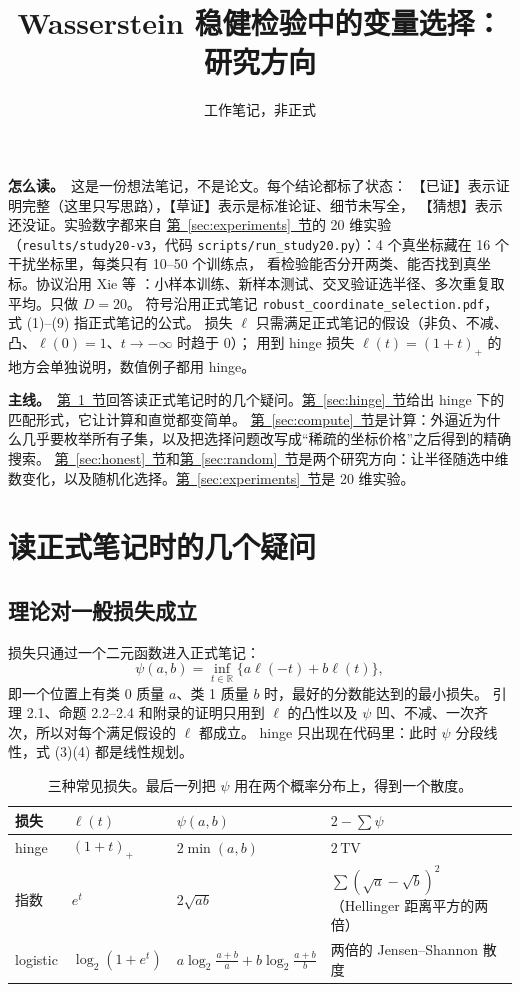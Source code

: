 \documentclass[11pt,a4paper,fontset=none]{ctexart}
\title{\bfseries Wasserstein 稳健检验中的变量选择：研究方向}
\author{}
\date{工作笔记，非正式}
\newcommand{\Secref}[1]{\hyperref[#1]{第~\ref*{#1}~节}}
\newcommand{\TV}{\mathrm{TV}}
\theoremstyle{definition}
\newcommand{\para}[1]{\par\smallskip\noindent\textbf{#1}\ }
\newcommand{\status}[1]{\textrm{【#1】}}
\begin{document}
\pagestyle{plain}
\maketitle
\vspace{-2em}

\para{怎么读。}这是一份想法笔记，不是论文。每个结论都标了状态：
\status{已证}表示证明完整（这里只写思路），\status{草证}表示是标准论证、细节未写全，
\status{猜想}表示还没证。实验数字都来自 \Secref{sec:experiments}的 20 维实验
（\texttt{results/study20-v3}，代码 \texttt{scripts/run\_study20.py}）：4 个真坐标藏在 16 个干扰坐标里，每类只有 10--50 个训练点，
看检验能否分开两类、能否找到真坐标。协议沿用 Xie 等 \cite{xie2021robust}：小样本训练、新样本测试、交叉验证选半径、多次重复取平均。只做 $D=20$。
符号沿用正式笔记 \texttt{robust\_coordinate\_selection.pdf}，式 (1)--(9) 指正式笔记的公式。
损失 $\ell$ 只需满足正式笔记的假设（非负、不减、凸、$\ell(0)=1$、$t\to-\infty$ 时趋于 0）；
用到 hinge 损失 $\ell(t)=(1+t)_+$ 的地方会单独说明，数值例子都用 hinge。

\para{主线。}\Secref{sec:faq}回答读正式笔记时的几个疑问。\Secref{sec:hinge}给出 hinge 下的匹配形式，它让计算和直觉都变简单。
\Secref{sec:compute}是计算：外逼近为什么几乎要枚举所有子集，以及把选择问题改写成“稀疏的坐标价格”之后得到的精确搜索。
\Secref{sec:honest}和\Secref{sec:random}是两个研究方向：让半径随选中维数变化，以及随机化选择。\Secref{sec:experiments}是 20 维实验。

\section{读正式笔记时的几个疑问}\label{sec:faq}

\subsection{理论对一般损失成立}
损失只通过一个二元函数进入正式笔记：
\[
\psi(a,b)=\inf_{t\in\mathbb R}\{a\ell(-t)+b\ell(t)\},
\]
即一个位置上有类 0 质量 $a$、类 1 质量 $b$ 时，最好的分数能达到的最小损失。
引理 2.1、命题 2.2--2.4 和附录的证明只用到 $\ell$ 的凸性以及 $\psi$ 凹、不减、一次齐次，所以对每个满足假设的 $\ell$ 都成立。
hinge 只出现在代码里：此时 $\psi$ 分段线性，式 (3)(4) 都是线性规划。

\begin{table}[htbp]
\centering\small
\begin{tabular}{llll}
\toprule
损失 & $\ell(t)$ & $\psi(a,b)$ & $2-\sum\psi$\\
\midrule
hinge & $(1+t)_+$ & $2\min(a,b)$ & $2\,\TV$\\
指数 & $e^t$ & $2\sqrt{ab}$ & $\sum(\sqrt a-\sqrt b)^2$（Hellinger 距离平方的两倍）\\
logistic & $\log_2(1+e^t)$ & $a\log_2\frac{a+b}a+b\log_2\frac{a+b}b$ & 两倍的 Jensen--Shannon 散度\\
\bottomrule
\end{tabular}
\caption{三种常见损失。最后一列把 $\psi$ 用在两个概率分布上，得到一个散度。}
\label{tab:loss}
\end{table}
\end{document}
